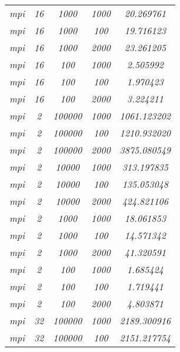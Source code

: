 \documentclass[../main.tex]{subfiles}
\begin{document}
\begin{table}[]
\begin{tabular}{|c|c|c|c|c|}
\textit{mpi}     & \textit{16}      & \textit{1000}   & \textit{1000} & \textit{20.269761}   \\
\textit{mpi}     & \textit{16}      & \textit{1000}   & \textit{100}  & \textit{19.716123}   \\
\textit{mpi}     & \textit{16}      & \textit{1000}   & \textit{2000} & \textit{23.261205}   \\
\textit{mpi}     & \textit{16}      & \textit{100}    & \textit{1000} & \textit{2.505992}    \\
\textit{mpi}     & \textit{16}      & \textit{100}    & \textit{100}  & \textit{1.970423}    \\
\textit{mpi}     & \textit{16}      & \textit{100}    & \textit{2000} & \textit{3.224211}    \\
\textit{mpi}     & \textit{2}       & \textit{100000} & \textit{1000} & \textit{1061.123202} \\
\textit{mpi}     & \textit{2}       & \textit{100000} & \textit{100}  & \textit{1210.932020} \\
\textit{mpi}     & \textit{2}       & \textit{100000} & \textit{2000} & \textit{3875.080549} \\
\textit{mpi}     & \textit{2}       & \textit{10000}  & \textit{1000} & \textit{313.197835}  \\
\textit{mpi}     & \textit{2}       & \textit{10000}  & \textit{100}  & \textit{135.053048}  \\
\textit{mpi}     & \textit{2}       & \textit{10000}  & \textit{2000} & \textit{424.821106}  \\
\textit{mpi}     & \textit{2}       & \textit{1000}   & \textit{1000} & \textit{18.061853}   \\
\textit{mpi}     & \textit{2}       & \textit{1000}   & \textit{100}  & \textit{14.571342}   \\
\textit{mpi}     & \textit{2}       & \textit{1000}   & \textit{2000} & \textit{41.320591}   \\
\textit{mpi}     & \textit{2}       & \textit{100}    & \textit{1000} & \textit{1.685424}    \\
\textit{mpi}     & \textit{2}       & \textit{100}    & \textit{100}  & \textit{1.719441}    \\
\textit{mpi}     & \textit{2}       & \textit{100}    & \textit{2000} & \textit{4.803871}    \\
\textit{mpi}     & \textit{32}      & \textit{100000} & \textit{1000} & \textit{2189.300916} \\
\textit{mpi}     & \textit{32}      & \textit{100000} & \textit{100}  & \textit{2151.217754} \\

\end{tabular}
\end{table}
\end{document}
